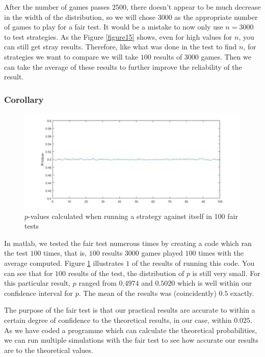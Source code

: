 \documentclass[a4paper,titlepage]{article}
\begin{document}
After the number of games passes $2500$, there doesn’t appear to be much decrease in the width of the distribution, so we will chose $3000$ as the appropriate number of games to play for a fair test. It would be a mistake to now only use $n=3000$ to test strategies. As the Figure \ref{figure15} shows, even for high values for $n$, you can still get stray results. Therefore, like what was done in the test to find $n$, for strategies we want to compare we will take $100$ results of $3000$ games. Then we can take the average of these results to further improve the reliability of the result.
\subsubsection{Corollary}
\begin{figure}
\centering
\includegraphics[width=\textwidth]{stats_2}
\caption{$p$-values calculated when running a strategy against itself in 100 fair tests\label{figure16}}
\end{figure}
In matlab, we tested the fair test numerous times by creating a code which ran the test $100$ times, that is, $100$ results $3000$ games played $100$ times with the average computed. Figure \ref{figure16} illustrates $1$ of the results of running this code. You can see that for $100$ results of the test, the distribution of $p$ is still very small. For this particular result, $p$ ranged from $0.4974$ and $0.5020$ which is well within our confidence interval for $p$. The mean of the results was (coincidently) $0.5$ exactly.

The purpose of the fair test is that our practical results are accurate to within a certain degree of confidence to the theoretical results, in our case, within $0.025$. As we have coded a programme which can calculate the theoretical probabilities, we can run multiple simulations with the fair test to see how accurate our results are to the theoretical values.
\end{document}
